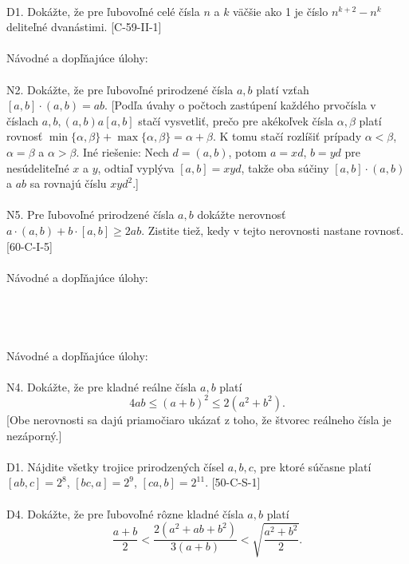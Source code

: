 \\
D1. Dokážte, že pre ľubovoľné celé čísla $n$ a $k$ väčšie ako 1 je číslo $n^{k+2} - n^k$ deliteľné dvanástimi. [C-59-II-1]\\
\\
Návodné a dopľňajúce úlohy:\\
\\
N2. Dokážte, že pre ľubovoľné prirodzené čísla $a, b$ platí vzťah $[a, b] \cdot (a, b) = ab$. [Podľa úvahy o počtoch zastúpení každého prvočísla v číslach $a, b, (a, b) a [a, b]$ stačí vysvetliť, prečo pre akékoľvek čísla $\alpha, \beta$ platí rovnosť $\min\{\alpha, \beta\} + \max \{\alpha, \beta\} = \alpha + \beta$. K tomu stačí rozlíšiť prípady $\alpha < \beta$, $\alpha = \beta$ a $\alpha > \beta$. Iné riešenie: Nech $d = (a, b)$, potom $a = xd$, $b = yd$ pre nesúdeliteľné $x$ a $y$, odtiaľ vyplýva $[a, b] = xyd$, takže oba súčiny $[a, b] \cdot (a, b)$ a $ab$ sa rovnajú číslu $xyd^2$.]\\
\\
N5. Pre ľubovoľné prirodzené čísla $a, b$ dokážte nerovnosť $a \cdot (a, b) + b \cdot [a, b] \geq 2ab$. Zistite tiež, kedy v tejto nerovnosti nastane rovnosť. [60-C-I-5]\\
\\

Návodné a dopľňajúce úlohy:\\
\\

\\

\\

\\
Návodné a dopľňajúce úlohy:\\
\\
N4. Dokážte, že pre kladné reálne čísla $a, b$ platí
$$4ab \leq (a + b)^2 \leq 2(a^2+ b^2).$$
[Obe nerovnosti sa dajú priamočiaro ukázať z toho, že štvorec reálneho čísla je nezáporný.]\\
\\
D1. Nájdite všetky trojice prirodzených čísel $a, b, c$, pre ktoré súčasne platí $[ab, c] = 2^8$, $[bc, a] = 2^9$, $[ca, b] = 2^11$. [50-C-S-1]\\
\\
D4. Dokážte, že pre ľubovoľné rôzne kladné čísla $a, b$ platí
$$\frac{a + b}{2}<\frac{2(a^2+ ab + b^2)}{3(a + b)}< \sqrt{\frac{a^2 + b^2}{2}}.$$
\\

\\

